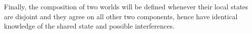 
Finally, the composition of two worlds will be defined whenever their local states are disjoint and they agree on all other two components, hence have identical knowledge of the shared state and possible interferences.\\

